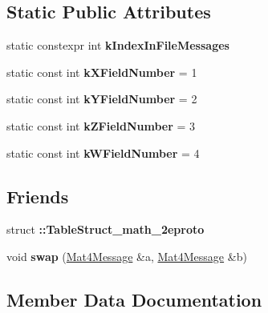 \subsection*{Static Public Attributes}
\begin{DoxyCompactItemize}
\item 
static constexpr int {\bfseries k\+Index\+In\+File\+Messages}
\item 
\mbox{\label{classtbMath_1_1Mat4Message_af87a2b93c300ade2ea0734c87f48fa4d}} 
static const int {\bfseries k\+X\+Field\+Number} = 1
\item 
\mbox{\label{classtbMath_1_1Mat4Message_aedafc6dfb8a9bb3bcd470d7e575794a7}} 
static const int {\bfseries k\+Y\+Field\+Number} = 2
\item 
\mbox{\label{classtbMath_1_1Mat4Message_a36b21e97176543dc0013eb2d688c51c6}} 
static const int {\bfseries k\+Z\+Field\+Number} = 3
\item 
\mbox{\label{classtbMath_1_1Mat4Message_ab2e73823e55cf928cb308f6a3c0b72f4}} 
static const int {\bfseries k\+W\+Field\+Number} = 4
\end{DoxyCompactItemize}
\subsection*{Friends}
\begin{DoxyCompactItemize}
\item 
\mbox{\label{classtbMath_1_1Mat4Message_a016291c3138deb3d18455a730e2da9b1}} 
struct {\bfseries \+::\+Table\+Struct\+\_\+math\+\_\+2eproto}
\item 
\mbox{\label{classtbMath_1_1Mat4Message_a27ed07f7be6d885fc3335fd7c69ecacd}} 
void {\bfseries swap} (\hyperlink{classtbMath_1_1Mat4Message}{Mat4\+Message} \&a, \hyperlink{classtbMath_1_1Mat4Message}{Mat4\+Message} \&b)
\end{DoxyCompactItemize}


\subsection{Member Data Documentation}
\mbox{\label{classtbMath_1_1Mat4Message_a3054cd07faab41ac8349b63567d37216}} 
